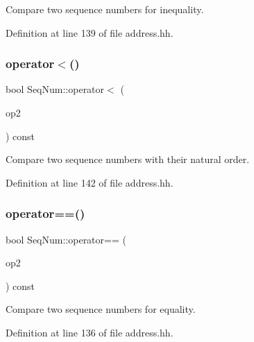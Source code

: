 Compare two sequence numbers for inequality. 



Definition at line 139 of file address.\+hh.

\mbox{\label{class_seq_num_aeb254f95288b456c6554b7950a499705}} 
\subsubsection{\texorpdfstring{operator$<$()}{operator<()}}
{\footnotesize\ttfamily bool Seq\+Num\+::operator$<$ (\begin{DoxyParamCaption}\item[{const \mbox{\hyperlink{class_seq_num}{Seq\+Num}} \&}]{op2 }\end{DoxyParamCaption}) const\hspace{0.3cm}{\ttfamily [inline]}}



Compare two sequence numbers with their natural order. 



Definition at line 142 of file address.\+hh.

\mbox{\label{class_seq_num_a11552f9049fa1fcd8ea255d0236c1a2f}} 
\subsubsection{\texorpdfstring{operator==()}{operator==()}}
{\footnotesize\ttfamily bool Seq\+Num\+::operator== (\begin{DoxyParamCaption}\item[{const \mbox{\hyperlink{class_seq_num}{Seq\+Num}} \&}]{op2 }\end{DoxyParamCaption}) const\hspace{0.3cm}{\ttfamily [inline]}}



Compare two sequence numbers for equality. 



Definition at line 136 of file address.\+hh.

\mbox{\label{class_seq_num_abf4894a48a7ba90309bab7c56ccb2a65}} 
